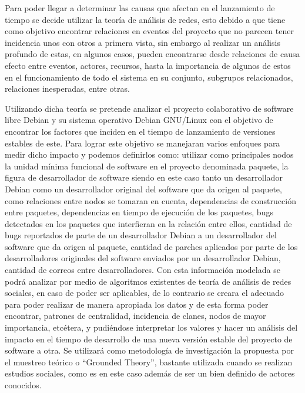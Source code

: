 \documentclass[letterpaper,12pt,titlepage]{report}
\begin{document}
\begin{comment}
- Mencionar brevemente que hay estudios que indican que el desarrollo de SL son proyectos humano-sociales en red(causa)
- Mencionar que el SNA puede ser utilizado para este tipo de relaciones (consequencia))
\end{comment}
Para poder llegar a determinar las causas que afectan en el
lanzamiento de tiempo se decide utilizar la teoría de análisis de
redes, esto debido a que tiene como objetivo encontrar relaciones en
eventos del proyecto que no parecen tener incidencia unos con otros a
primera vista, sin embargo al realizar un análisis profundo de estas,
en algunos casos, pueden encontrarse desde relaciones de causa efecto
entre eventos, actores, recursos, hasta la importancia de algunos de
estos en el funcionamiento de todo el sistema en su conjunto,
subgrupos relacionados, relaciones inesperadas, entre otras.

Utilizando dicha teoría se pretende analizar el proyecto colaborativo
de software libre Debian y su sistema operativo Debian GNU/Linux con
el objetivo de encontrar los factores que inciden en el tiempo de
lanzamiento de versiones estables de este.  Para lograr este objetivo
se manejaran varios enfoques para medir dicho impacto y podemos
definirlos como: utilizar como principales nodos la unidad mínima
funcional de software en el proyecto denominada paquete, la figura de
desarrollador de software siendo en este caso tanto un desarrollador
Debian como un desarrollador original del software que da origen al
paquete, como relaciones entre nodos se tomaran en cuenta,
dependencias de construcción entre paquetes, dependencias en tiempo de
ejecución de los paquetes, bugs detectados en los paquetes que
interfieran en la relación entre ellos, cantidad de bugs reportados de
parte de un desarrollador Debian a un desarrollador del software que
da origen al paquete, cantidad de parches aplicados por parte de los
desarrolladores originales del software enviados por un desarrollador
Debian, cantidad de correos entre desarrolladores.  Con esta
información modelada se podrá analizar por medio de algoritmos
existentes de teoría de análisis de redes sociales, en caso de poder
ser aplicables, de lo contrario se creara el adecuado para poder
realizar de manera apropiada los datos y de esta forma poder
encontrar, patrones de centralidad, incidencia de clanes, nodos de
mayor importancia, etcétera, y pudiéndose interpretar los valores y
hacer un análisis del impacto en el tiempo de desarrollo de una nueva
versión estable del proyecto de software a otra.  Se utilizará como
metodología de investigación la propuesta por el muestreo teórico o
``Grounded Theory'', bastante utilizada cuando se realizan estudios
sociales, como es en este caso además de ser un bien definido de
actores conocidos.
\end{document}
